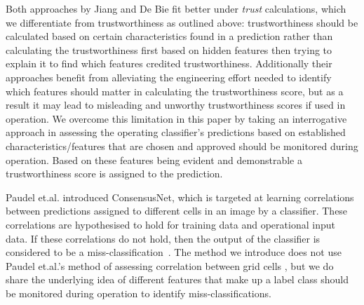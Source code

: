 Both approaches by Jiang and De Bie fit better under \textit{trust} %
calculations, which we differentiate from trustworthiness as outlined above:  trustworthiness should be calculated based on certain characteristics found in a prediction rather than calculating the trustworthiness first based on hidden features then trying to explain it to find which features credited trustworthiness. Additionally their approaches benefit from alleviating the engineering effort needed to identify which features should matter in calculating the trustworthiness score, but as a result it may lead to misleading and unworthy trustworthiness scores if used in operation.
%
%
We overcome this limitation in this paper by taking an interrogative approach in assessing the operating classifier's predictions based on established characteristics/features that are chosen and approved should be monitored during operation. Based on these features being evident and demonstrable a trustworthiness score is assigned to the prediction.
%
%

Paudel et.al. introduced ConsensusNet, which is targeted at learning correlations between predictions assigned to different cells in an image by a classifier.%
%
These correlations are hypothesised to hold for training data and operational input data. If these correlations do not hold, then the output of the classifier is considered to be a miss-classification~\cite{Paudel2021}. 
%
The method we introduce
does not use Paudel et.al.'s method of assessing correlation between grid cells
, but we do share the underlying idea of different features that make up a label class should be monitored during operation to identify miss-classifications.

